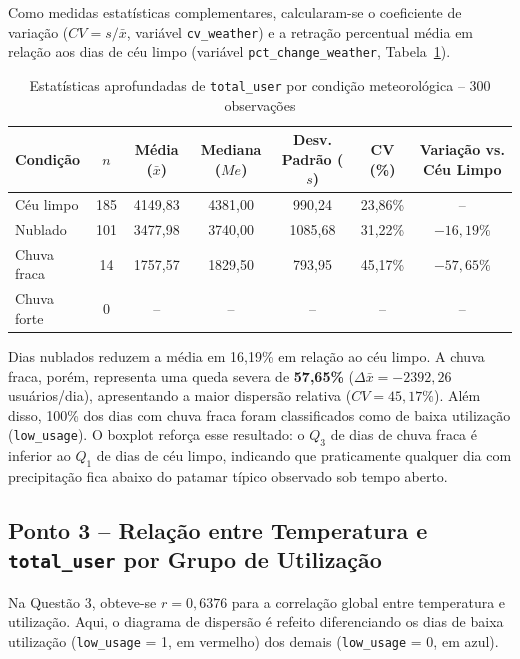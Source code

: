 \documentclass[10pt, a4paper]{article}
\begin{document}
Como medidas estatísticas complementares, calcularam-se o coeficiente de variação ($CV = s/\bar{x}$, variável \texttt{cv\_weather}) e a retração percentual média em relação aos dias de céu limpo (variável \texttt{pct\_change\_weather}, Tabela~\ref{tab:comp-clima}).

\begin{table}[!htb]
\centering
\caption{Estatísticas aprofundadas de \texttt{total\_user} por condição meteorológica -- 300 observações}
\label{tab:comp-clima}
\begin{tabular}{lcccccc}
\hline
\textbf{Condição} & $n$ & \textbf{Média} ($\bar{x}$) & \textbf{Mediana} ($Me$) & \textbf{Desv. Padrão} ($s$) & \textbf{CV} (\%) & \textbf{Variação vs. Céu Limpo} \\
\hline
Céu limpo   & 185 & 4149,83 & 4381,00 & 990,24  & 23,86\% & -- \\
Nublado     & 101 & 3477,98 & 3740,00 & 1085,68 & 31,22\% & $-16{,}19\%$ \\
Chuva fraca & 14  & 1757,57 & 1829,50 & 793,95  & 45,17\% & $-57{,}65\%$ \\
Chuva forte & 0   & --      & --      & --      & --      & -- \\
\hline
\end{tabular}
\end{table}

Dias nublados reduzem a média em 16,19\% em relação ao céu limpo. A chuva fraca, porém, representa uma queda severa de \textbf{57,65\%} ($\Delta \bar{x} = -2392{,}26$ usuários/dia), apresentando a maior dispersão relativa ($CV = 45{,}17\%$). Além disso, 100\% dos dias com chuva fraca foram classificados como de baixa utilização (\texttt{low\_usage}). O boxplot reforça esse resultado: o $Q_3$ de dias de chuva fraca é inferior ao $Q_1$ de dias de céu limpo, indicando que praticamente qualquer dia com precipitação fica abaixo do patamar típico observado sob tempo aberto.

\clearpage
\subsection{Ponto 3 -- Relação entre Temperatura e \texttt{total\_user} por Grupo de Utilização}

Na Questão 3, obteve-se $r = 0{,}6376$ para a correlação global entre temperatura e utilização. Aqui, o diagrama de dispersão é refeito diferenciando os dias de baixa utilização (\texttt{low\_usage} = 1, em vermelho) dos demais (\texttt{low\_usage} = 0, em azul).
\end{document}
